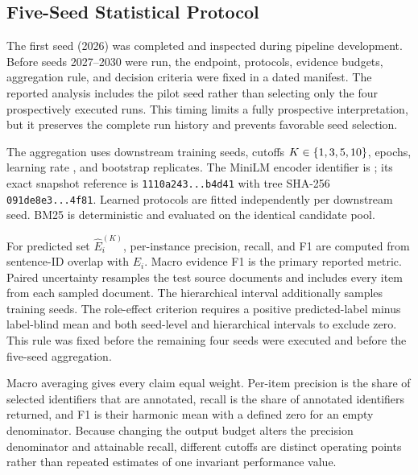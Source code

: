 \documentclass[applsci,article,submit,moreauthors]{Definitions/mdpi}
\begin{document}
\begin{table}[H]
\caption{Frozen downstream implementation choices, generated from a hash-bound implementation contract checked against the executable source.}\label{tab:implementation}
\centering\small
\end{table}

\subsection{Five-Seed Statistical Protocol}
The first seed (2026) was completed and inspected during pipeline development. Before seeds 2027--2030 were run, the endpoint, protocols, evidence budgets, aggregation rule, and decision criteria were fixed in a dated manifest. The reported analysis includes the pilot seed rather than selecting only the four prospectively executed runs. This timing limits a fully prospective interpretation, but it preserves the complete run history and prevents favorable seed selection.

The aggregation uses \SeedCount{} downstream training seeds, cutoffs $K\in\{1, 3, 5, 10\}$, \TrainingEpochs{} epochs, learning rate \LearningRate{}, and \BootstrapSamples{} bootstrap replicates. The MiniLM encoder identifier is \texttt{\EncoderModel}; its exact snapshot reference is \texttt{1110a243...b4d41} with tree SHA-256 \texttt{091de8e3...4f81}. Learned protocols are fitted independently per downstream seed. BM25 is deterministic and evaluated on the identical candidate pool.

For predicted set $\widehat E_i^{(K)}$, per-instance precision, recall, and F1 are computed from sentence-ID overlap with $E_i$. Macro evidence F1 is the primary reported metric. Paired uncertainty resamples the \TestDocuments{} test source documents and includes every item from each sampled document. The hierarchical interval additionally samples training seeds. The role-effect criterion requires a positive predicted-label minus label-blind mean and both seed-level and hierarchical intervals to exclude zero. This rule was fixed before the remaining four seeds were executed and before the five-seed aggregation.

Macro averaging gives every claim equal weight. Per-item precision is the share of selected identifiers that are annotated, recall is the share of annotated identifiers returned, and F1 is their harmonic mean with a defined zero for an empty denominator. Because changing the output budget alters the precision denominator and attainable recall, different cutoffs are distinct operating points rather than repeated estimates of one invariant performance value.
\end{document}
